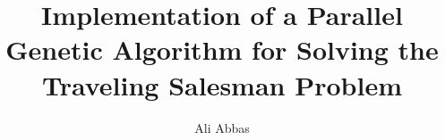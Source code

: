\documentclass[10pt,journal,compsoc]{IEEEtran}
\begin{document}
%
\title{Implementation of a Parallel Genetic Algorithm for Solving the Traveling Salesman Problem}
%
%
%
%

\author{Ali Abbas%
}

% 
%
\end{document}
